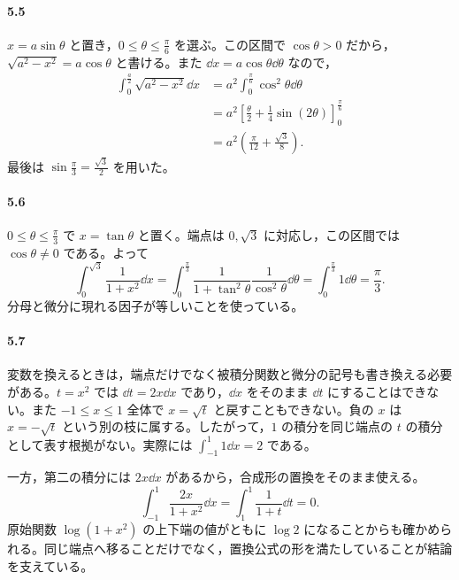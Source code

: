 \paragraph{5.5}
$x=a\sin\theta$ と置き，$0\le\theta\le\frac\pi6$ を選ぶ。この区間で $\cos\theta>0$ だから，$\sqrt{a^2-x^2}=a\cos\theta$ と書ける。また $\dd x=a\cos\theta\dd\theta$ なので，
\[
\begin{aligned}
 \int_0^{\frac a2}\sqrt{a^2-x^2}\dd x
 &=a^2\int_0^{\frac\pi6}\cos^2\theta\dd\theta\\
 &=a^2\left[\frac\theta2+\frac14\sin(2\theta)\right]_0^{\frac\pi6}\\
 &=a^2\left(\frac\pi{12}+\frac{\sqrt3}{8}\right).
\end{aligned}
\]
最後は $\sin\frac\pi3=\frac{\sqrt3}{2}$ を用いた。

\paragraph{5.6}
$0\le\theta\le\frac\pi3$ で $x=\tan\theta$ と置く。端点は $0,\sqrt3$ に対応し，この区間では $\cos\theta\ne0$ である。よって
\[
 \int_0^{\sqrt3}\frac1{1+x^2}\dd x
 =\int_0^{\frac\pi3}\frac1{1+\tan^2\theta}
   \frac1{\cos^2\theta}\dd\theta
 =\int_0^{\frac\pi3}1\dd\theta=\frac\pi3.
\]
分母と微分に現れる因子が等しいことを使っている。

\paragraph{5.7}
変数を換えるときは，端点だけでなく被積分関数と微分の記号も書き換える必要がある。$t=x^2$ では $\dd t=2x\dd x$ であり，$\dd x$ をそのまま $\dd t$ にすることはできない。また $-1\le x\le1$ 全体で $x=\sqrt{t}$ と戻すこともできない。負の $x$ は $x=-\sqrt{t}$ という別の枝に属する。したがって，$1$ の積分を同じ端点の $t$ の積分として表す根拠がない。実際には $\int_{-1}^1 1\dd x=2$ である。

一方，第二の積分には $2x\dd x$ があるから，合成形の置換をそのまま使える。
\[
 \int_{-1}^1\frac{2x}{1+x^2}\dd x
 =\int_1^1\frac1{1+t}\dd t=0.
\]
原始関数 $\log(1+x^2)$ の上下端の値がともに $\log2$ になることからも確かめられる。同じ端点へ移ることだけでなく，置換公式の形を満たしていることが結論を支えている。
